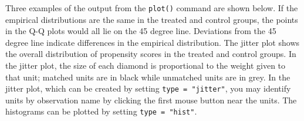 
Three examples of the output from the {\tt plot()} command are shown
below.  If the empirical distributions are the same in the treated and
control groups, the points in the Q-Q plots would all lie on the 45 degree line.
Deviations from the 45 degree line indicate differences in the
empirical distribution.  The jitter plot shows the overall
distribution of propensity scores in the treated and control groups.
In the jitter plot, the size of each diamond is proportional to the
weight given to that unit; matched units are in black while unmatched
units are in grey. In the jitter
plot, which can be created by setting \texttt{type = "jitter"}, you
may identify units by observation name by clicking the first mouse
button near the units.  The histograms can be plotted by setting \texttt{type = "hist"}. 


